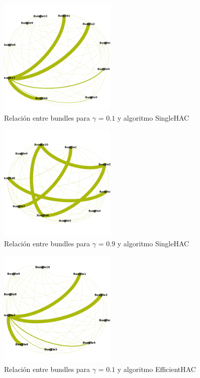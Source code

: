 \begin{figure}[H]
  \centering
    \includegraphics[width=0.5\textwidth]{resultados/papers/intra_inter/hac01.png}
  \caption{Relación entre bundles para $\gamma$ = $0.1$ y algoritmo SingleHAC}
  \label{res:img-gamma01-hac}
\end{figure}

\begin{figure}[H]
  \centering
    \includegraphics[width=0.5\textwidth]{resultados/papers/intra_inter/hac09.png}
  \caption{Relación entre bundles para $\gamma$ = $0.9$ y algoritmo SingleHAC}
  \label{res:img-gamma09-hac}
\end{figure}

\begin{figure}[H]
  \centering
    \includegraphics[width=0.5\textwidth]{resultados/papers/intra_inter/effhac01.png}
  \caption{Relación entre bundles para $\gamma$ = $0.1$ y algoritmo EfficientHAC}
  \label{res:img-gamma01-effhac}
\end{figure}

